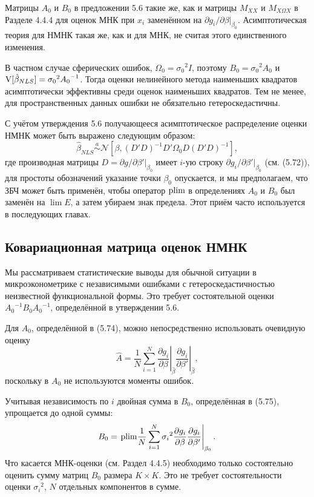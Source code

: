 Матрицы $A_0$ и $B_0$ в предложении 5.6 такие же, как и матрицы $M_{XX}$ и $M_{X \Omega X}$ в Разделе 4.4.4 для оценок МНК при $x_i$ заменённом на $\partial g_i/\partial \beta|_{\beta_0}$. Асимптотическая теория для НМНК такая же, как и для МНК, не считая этого единственного изменения.

В частном случае сферических ошибок, $\Omega_0={\sigma_0}^{2}I$, поэтому $B_0={\sigma_0}^{2}A_0$ и $\mathrm{V}[\hat{\beta}_{NLS}]={\sigma_0}^{2}{A_0}^{-1}$. Тогда оценки нелинейного метода наименьших квадратов асимптотически эффективны среди оценок наименьших квадратов. Тем не менее, для пространственных данных ошибки не обязательно гетероскедастичны.

С учётом утверждения 5.6 получающееся асимптотическое распределение оценки НМНК может быть выражено следующим образом:
\begin{equation}
\hat{\beta}_{NLS} \stackrel{a}{\sim} \mathcal{N}[\beta,(D'D)^{-1} D' \Omega_0 D (D'D)^{-1}],
\end{equation}
где производная матрицы $D=\partial g / \partial \beta'|_{\beta_0}$ имеет $i$-ую строку $\partial g_i/ \partial \beta'|_{\beta_0}$ (см. (5.72)), для простоты обозначений указание точки $\beta_0$ опускается, и мы предполагаем, что ЗБЧ может быть применён, чтобы оператор $\mathrm{plim }$ в определениях $A_0$ и $B_0$ был заменён на $\lim E$, а затем убираем знак предела. Этот приём часто используется в последующих главах.

\subsection{Ковариационная матрица оценок НМНК}

Мы рассматриваем статистические выводы для обычной ситуации в микроэконометрике с независимыми ошибками с гетероскедастичностью неизвестной функциональной формы. Это требует состоятельной оценки ${A_0}^{-1}B_0{A_0}^{-1}$, определённой в утверждении 5.6. 

Для $A_0$, определённой в (5.74), можно непосредственно использовать очевидную оценку
\begin{equation}
\hat{A}= \left. \frac{1}{N} \sum_{i=1}^{N} \frac{\partial g_i}{\partial \beta} \right|_{\hat{\beta}} \left. \frac{\partial g_i}{\partial \beta'} \right|_{\hat{\beta}},
\end{equation}
поскольку в $A_0$ не используются моменты ошибок.

Учитывая независимость по $i$ двойная сумма в $B_0$, определённая в (5.75), упрощается до одной суммы:
\[
B_0= \left. \mathrm{plim } \frac{1}{N} \sum_{i=1}^{N} {\sigma_i}^2 \frac{\partial g_i}{\partial \beta} \frac{\partial g_i}{\partial \beta'} \right|_{\beta_0}.
\]
Что касается МНК-оценки (см. Раздел 4.4.5) необходимо только состоятельно оценить сумму матриц $B_0$ размера $K \times K$. Это не требует состоятельности оценки ${\sigma_i}^2$, $N$ отдельных компонентов в сумме.

